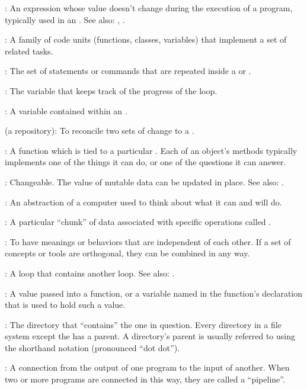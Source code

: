:
An expression whose value doesn't change during the
execution of a program, typically used in an
. See also:
,
.

:
A family of code units (functions, classes, variables)
that implement a set of related tasks.

:
The set of statements or commands that are repeated inside a 
or .

:
The variable that keeps track of the progress of
the loop.

:
A variable contained within an
.

 (a repository):
To reconcile two sets of change to a
.

:
A function which is tied to a particular
. Each of an object's methods typically
implements one of the things it can do, or one of the questions it can
answer.

:
Changeable. The value of mutable data can be updated
in place. See also: .

:
An abstraction of a computer used to think
about what it can and will do.

:
A particular ``chunk'' of data associated with specific
operations called .

:
To have meanings or behaviors that are independent
of each other. If a set of concepts or tools are orthogonal, they can be
combined in any way.

:
A loop that contains another loop. See also:
.

:
A value passed into a function, or a variable named
in the function's declaration that is used to hold such a value.

:
The directory that ``contains'' the one in
question. Every directory in a file system except the
 has a parent. A directory's
parent is usually referred to using the shorthand notation 
(pronounced ``dot dot'').

:
A connection from the output of one program to the input
of another. When two or more programs are connected in this way, they
are called a ``pipeline''.

